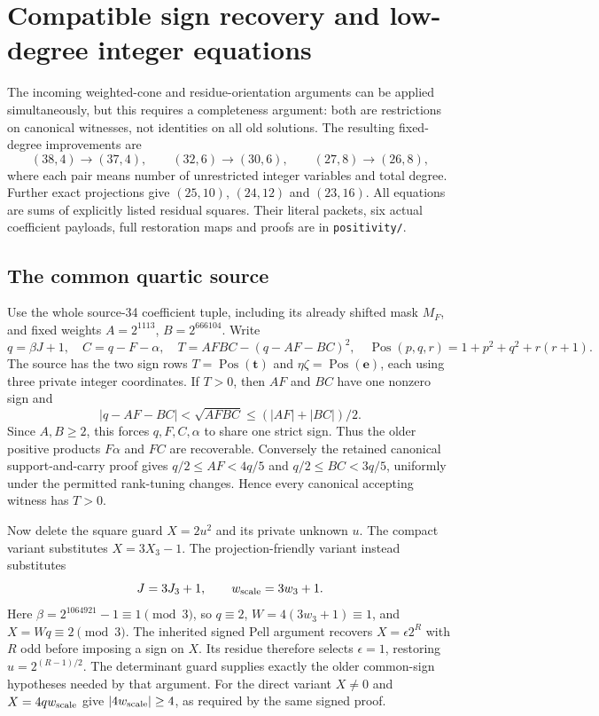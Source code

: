 \section{Compatible sign recovery and low-degree integer equations}
The incoming weighted-cone and residue-orientation arguments can be applied
simultaneously, but this requires a completeness argument: both are
restrictions on canonical witnesses, not identities on all old solutions.
The resulting fixed-degree improvements are
\[
 (38,4)\longrightarrow(37,4),\qquad
 (32,6)\longrightarrow(30,6),\qquad
 (27,8)\longrightarrow(26,8),
\]
where each pair means number of unrestricted integer variables and total
degree. Further exact projections give $(25,10)$, $(24,12)$ and $(23,16)$.
All equations are sums of explicitly listed residual squares. Their literal
packets, six actual coefficient payloads, full restoration maps and proofs
are in \texttt{positivity/}.

\subsection{The common quartic source}
Use the whole source-34 coefficient tuple, including its already shifted
mask $M_F$, and fixed weights $A=2^{1113}$, $B=2^{666104}$. Write
\[
 q=\beta J+1,\quad C=q-F-\alpha,\quad
 T=AFBC-(q-AF-BC)^2,
 \quad \operatorname{Pos}(p,q,r)=1+p^2+q^2+r(r+1).
\]
The source has the two sign rows $T=\operatorname{Pos}(\mathbf t)$ and
$\eta\zeta=\operatorname{Pos}(\mathbf e)$, each using three private
integer coordinates. If $T>0$, then $AF$ and $BC$ have one nonzero sign and
\[
 |q-AF-BC|<\sqrt{AFBC}\leq (|AF|+|BC|)/2.
\]
Since $A,B\geq2$, this forces $q,F,C,\alpha$ to share one strict sign.
Thus the older positive products $F\alpha$ and $FC$ are recoverable.
Conversely the retained canonical support-and-carry proof gives
$q/2\leq AF<4q/5$ and $q/2\leq BC<3q/5$, uniformly under the permitted
rank-tuning changes. Hence every canonical accepting witness has $T>0$.

Now delete the square guard $X=2u^2$ and its private unknown $u$.
The compact variant substitutes $X=3X_3-1$. The projection-friendly variant
instead substitutes
\[
 J=3J_3+1,\qquad w_{\rm scale}=3w_3+1.
\]
Here $\beta=2^{1064921}-1\equiv1\pmod3$, so
$q\equiv2$, $W=4(3w_3+1)\equiv1$, and $X=Wq\equiv2\pmod3$.
The inherited signed Pell argument recovers $X=\epsilon2^R$ with $R$
odd before imposing a sign on $X$. Its residue therefore selects
$\epsilon=1$, restoring $u=2^{(R-1)/2}$. The determinant guard supplies
exactly the older common-sign hypotheses needed by that argument.
For the direct variant $X\ne0$ and $X=4q w_{\rm scale}$ give
$|4w_{\rm scale}|\geq4$, as required by the same signed proof.

